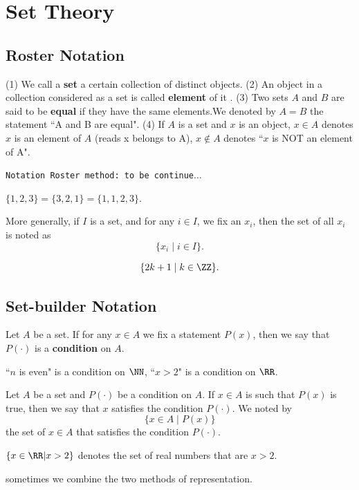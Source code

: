 \chapter{Set Theory}
\section{Roster Notation}
\begin{definitionenv}
    \quad
    \newline
    (1) We call a \textbf{set} a certain collection of distinct objects.
    \newline
    (2) An object in a collection considered as a set is called \textbf{element} of it .
    \newline
    (3) Two sets $A$ and $B$ are said to be \textbf{equal} if they have the same elements.We denoted by $A=B$ the statement ``A and B are equal".
    \newline
    (4) If $A$ is a set and $x$ is an object,  $x \in A$ denotes $x$ is an element of $A$ (reads x belongs to A),  $x \notin A$ denotes ``$x$ is NOT an element of A".
\end{definitionenv}
\texttt{Notation Roster method: to be continue$\dots$}
\begin{exampleenv}
    $\{1, 2, 3\}=\{3, 2, 1\}=\{1, 1, 2, 3\}$.
\end{exampleenv}
\begin{box2}
More generally,  if $I$ is a set,  and for any $i \in I$,  we fix an $x_i$,  then the set of all $x_i$ is noted as $$\{x_i\mid i\in I\}.$$
\end{box2}
\begin{exampleenv}
    $$\{2k+1\mid k\in \ZZ\}.$$
\end{exampleenv}
\section{Set-builder Notation}
\begin{definitionenv}
    Let $A$ be a set. If for any $x\in A $ we fix a statement $P(x)$,  then we say that $P(\cdot)$ is a \textbf{condition} on $A$. 
\end{definitionenv}
\begin{exampleenv}
    ``$n$ is even" is a condition on $\NN$, ``$x>2$" is a condition on $\RR$.
\end{exampleenv}
\begin{definitionenv}
    Let $A$ be a set and $P(\cdot)$ be a condition on $A$. If $x\in A$ is such that $P(x)$ is true,  then we say that $x$ satisfies the condition $P(\cdot)$. We noted by $$\{x \in A\mid P(x)\}$$the set of $x\in A$ that satisfies the condition $P(\cdot)$.
\end{definitionenv}
\begin{exampleenv}
    $\{x\in \RR|x>2\}$ denotes the set of real numbers that are $x>2$.
\end{exampleenv}
\begin{box2}
\begin{center}
    sometimes we combine the two methods of representation.
\end{center}
\end{box2}




